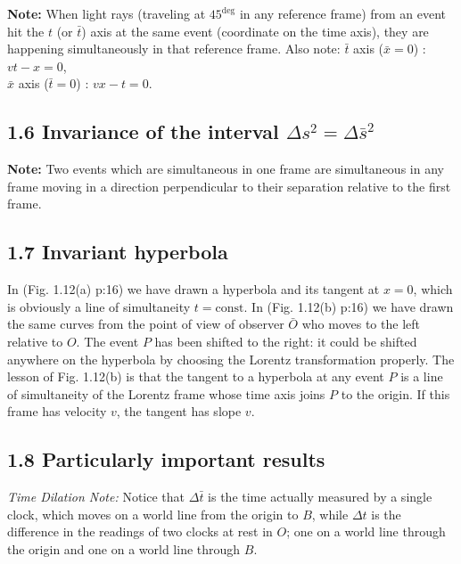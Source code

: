 \documentclass[12pt]{book}
\begin{document}
        \textbf{Note:} When light rays (traveling at \(45^{\deg}\) in any reference frame) from an event hit the \(t\) (or \(\bar{t}\)) axis at the same event (coordinate on the time axis), they are happening simultaneously in that reference frame. Also note:
        \(\bar{t}\) axis (\(\bar{x} = 0\)) : \( vt - x = 0 \),\\
        \(\bar{x}\) axis (\(\bar{t} = 0\)) : \( vx - t = 0 \).
        
    \subsection{1.6 Invariance of the interval \(\Delta s^2 = \Delta \bar{ s}^2\) }
        \textbf{Note:} Two events which are simultaneous in one frame are simultaneous in any frame moving in a direction perpendicular to their separation relative to the first frame.
        
    \subsection{1.7 Invariant hyperbola}
        In (Fig. 1.12(a) p:16) we have drawn a hyperbola and its tangent at \( x = 0 \), which is obviously a line of simultaneity \( t = \text{const} \). In (Fig. 1.12(b) p:16) we have drawn the same curves from the point of view of observer \( \bar{O} \) who moves to the left relative to \( O \). The event \( P \) has been shifted to the right: it could be shifted anywhere on the hyperbola by choosing the Lorentz transformation properly. The lesson of Fig. 1.12(b) is that the tangent to a hyperbola at any event \( P \) is a line of simultaneity of the Lorentz frame whose time axis joins \( P \) to the origin. If this frame has velocity \( v \), the tangent has slope \( v \).
    \subsection{1.8 Particularly important results}
        \textit{Time Dilation Note:} Notice that \( \Delta \bar{t} \) is the time actually measured by a single clock, which moves on a world line from the origin to \( B \), while \( \Delta t \) is the difference in the readings of two clocks at rest in \( O \); one on a world line through the origin and one on a world line through \( B \).
        
\end{document}
